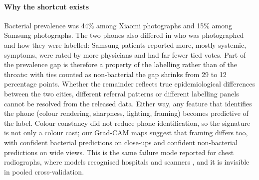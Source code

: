 \documentclass[preprint,12pt]{elsarticle}
\begin{document}
\paragraph{Why the shortcut exists} Bacterial prevalence was 44\% among Xiaomi photographs and 15\% among Samsung photographs. The two phones also differed in who was photographed and how they were labelled: Samsung patients reported more, mostly systemic, symptoms, were rated by more physicians and had far fewer tied votes. Part of the prevalence gap is therefore a property of the labelling rather than of the throats: with ties counted as non-bacterial the gap shrinks from 29 to 12 percentage points. Whether the remainder reflects true epidemiological differences between the two cities, different referral patterns or different labelling panels cannot be resolved from the released data. Either way, any feature that identifies the phone (colour rendering, sharpness, lighting, framing) becomes predictive of the label. Colour constancy did not reduce phone identification, so the signature is not only a colour cast; our Grad-CAM maps suggest that framing differs too, with confident bacterial predictions on close-ups and confident non-bacterial predictions on wide views. This is the same failure mode reported for chest radiographs, where models recognised hospitals and scanners \cite{zech2018pneumonia,degrave2021covid,badgeley2019hip}, and it is invisible in pooled cross-validation.
\end{document}

